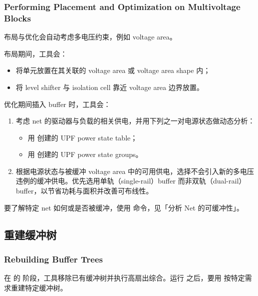 \subsubsection*{Performing Placement and Optimization on Multivoltage Blocks}

布局与优化会自动考虑多电压约束，例如 voltage area。

布局期间，工具会：
\begin{itemize}
  \item 将单元放置在其关联的 voltage area 或 voltage area shape 内；
  \item 将 level shifter 与 isolation cell 靠近 voltage area 边界放置。
\end{itemize}

优化期间插入 buffer 时，工具会：
\begin{enumerate}
  \item 考虑 net 的驱动器与负载的相关供电，并用下列之一对电源状态做动态分析：
        \begin{itemize}
          \item 用  创建的 UPF power state table；
          \item 用  创建的 UPF power state groups。
        \end{itemize}
  \item 根据电源状态与被缓冲 voltage area 中的可用供电，选择不会引入新的多电压违例的缓冲供电。优先选用单轨（single-rail）buffer 而非双轨（dual-rail）buffer，以节省功耗与面积并改善可布线性。
\end{enumerate}

要了解特定 net 如何或是否被缓冲，使用  命令，见「分析 Net 的可缓冲性」。

\subsection{重建缓冲树}
\subsubsection*{Rebuilding Buffer Trees}

在  的  阶段，工具移除已有缓冲树并执行高扇出综合。运行  之后，要用  按特定需求重建特定缓冲树。

